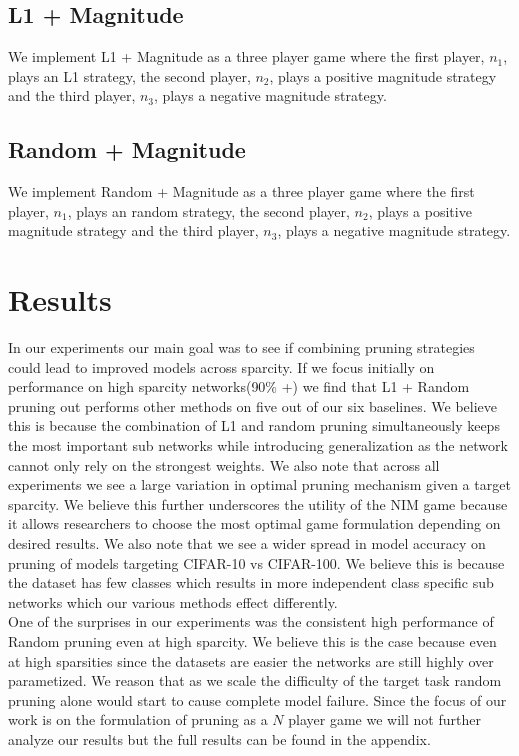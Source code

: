 \documentclass[11pt]{article}
\begin{document}
\subsection{L1 + Magnitude}
We implement L1 + Magnitude as a three player game where the first player, $n_1$, plays an L1 strategy, the second player, $n_2$, plays a positive magnitude strategy and the third player, $n_3$, plays a negative magnitude strategy.
\subsection{Random + Magnitude}
We implement Random + Magnitude as a three player game where the first player, $n_1$, plays an random strategy, the second player, $n_2$, plays a positive magnitude strategy and the third player, $n_3$, plays a negative magnitude strategy.
\section{Results}
In our experiments our main goal was to see if combining pruning strategies could lead to improved models across sparcity. If we focus initially on performance on high sparcity networks(90\% +) we find that L1 + Random pruning out performs other methods on five out of our six baselines. We believe this is because the combination of L1 and random pruning simultaneously keeps the most important sub networks while introducing generalization as the network cannot only rely on the strongest weights. We also note that across all experiments we see a large variation in optimal pruning mechanism given a target sparcity. We believe this further underscores the utility of the NIM game because it allows researchers to choose the most optimal game formulation depending on desired results. We also note that we see a wider spread in model accuracy on pruning of models targeting CIFAR-10 vs CIFAR-100. We believe this is because the dataset has few classes which results in more independent class specific sub networks which our various methods effect differently. \\
One of the surprises in our experiments was the consistent high performance of Random pruning even at high sparcity. We believe this is the case because even at high sparsities since the datasets are easier the networks are still highly over parametized. We reason that as we scale the difficulty of the target task random pruning alone would start to cause complete model failure. Since the focus of our work is on the formulation of pruning as a $N$ player game we will not further analyze our results but the full results can be found in the appendix. 
\end{document}
